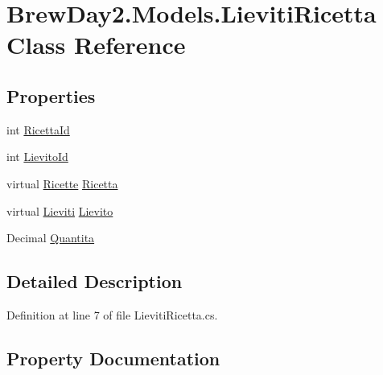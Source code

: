 \hypertarget{class_brew_day2_1_1_models_1_1_lieviti_ricetta}{}\section{Brew\+Day2.\+Models.\+Lieviti\+Ricetta Class Reference}
\label{class_brew_day2_1_1_models_1_1_lieviti_ricetta}
\subsection*{Properties}
\begin{DoxyCompactItemize}
\item 
int \mbox{\hyperlink{class_brew_day2_1_1_models_1_1_lieviti_ricetta_a877c7e560b3941ec7a9712630caf43b9}{Ricetta\+Id}}
\item 
int \mbox{\hyperlink{class_brew_day2_1_1_models_1_1_lieviti_ricetta_a32a5528411955b7973466553933cfee5}{Lievito\+Id}}
\item 
virtual \mbox{\hyperlink{class_brew_day2_1_1_models_1_1_ricette}{Ricette}} \mbox{\hyperlink{class_brew_day2_1_1_models_1_1_lieviti_ricetta_a61ce97f1cb0a7f7f97ef9c8f01d708bf}{Ricetta}}
\item 
virtual \mbox{\hyperlink{class_brew_day2_1_1_models_1_1_lieviti}{Lieviti}} \mbox{\hyperlink{class_brew_day2_1_1_models_1_1_lieviti_ricetta_a9a41b617597402d9862112011131211b}{Lievito}}
\item 
Decimal \mbox{\hyperlink{class_brew_day2_1_1_models_1_1_lieviti_ricetta_ae406027515f765c547349362d1c72633}{Quantita}}
\end{DoxyCompactItemize}


\subsection{Detailed Description}


Definition at line 7 of file Lieviti\+Ricetta.\+cs.



\subsection{Property Documentation}
\mbox{\label{class_brew_day2_1_1_models_1_1_lieviti_ricetta_a9a41b617597402d9862112011131211b}} 
